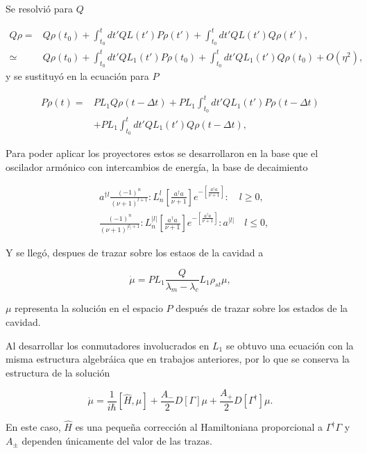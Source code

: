 \documentclass[10pt]{beamer}
\begin{document}
\begin{frame}
Se resolvió para $Q$

\begin{align*}
Q\rho =& Q\rho(t_0) + \int_{t_0}^{t}dt' QL(t')P\rho(t')+\int_{t_0}^{t}dt'QL(t')Q\rho(t'),\\
\simeq & Q\rho(t_0) + \int_{t_0}^{t}dt' QL_1(t')P\rho(t_0)+\int_{t_0}^{t}dt'QL_1(t')Q\rho(t_0)+O(\eta^2),
\end{align*} y se sustituyó en la ecuación para $P$

\begin{align*}
P\dot{\rho}(t) =& PL_1Q\rho(t-\Delta t) + PL_1\int_{t_0}^{t}dt' QL_1(t')P\rho(t-\Delta t)\\
 &+ PL_1\int_{t_0}^{t}dt'QL_1(t')Q\rho(t-\Delta t),
\end{align*} 

\end{frame}

\begin{frame}
Para poder aplicar los proyectores estos se desarrollaron en la base que el oscilador armónico con intercambios de energía, la base de decaimiento

\begin{align*}
&a^{\dagger l}\frac{(-1)^n}{(\nu+1)^{l+1}}:L_n^l[\frac{a^\dagger a}{\nu+1}]e^{-[\frac{a^\dagger a}{\nu+1}]}:\quad l \geq 0, \\
&\frac{(-1)^n}{(\nu+1)^{|l|+1}}:L_n^{|l|}[\frac{a^\dagger a}{\nu+1}]e^{-[\frac{a^\dagger a}{\nu+1}]}:a^{|l|}\quad l \leq 0,
\end{align*}
\end{frame}

\begin{frame}
Y se llegó, despues de trazar sobre los estaos de la cavidad a

\begin{equation*}
\dot{\mu} = PL_1 \frac{Q}{\lambda_m-\lambda_c}L_1\rho_{st}\mu,
\end{equation*}

$\mu$ representa la solución en el espacio $P$ después de trazar sobre los estados de la cavidad. 
\end{frame}

\begin{frame}

Al desarrollar los conmutadores involucrados en $L_1$ se obtuvo una ecuación con la misma estructura algebráica que en trabajos anteriores, por lo que se conserva la estructura de la solución

\begin{equation*}
\dot{\mu} = \frac{1}{i\hbar}[\hat{H},\mu] + \frac{A_-}{2}D[\Gamma]\mu + \frac{A_+}{2}D[\Gamma^\dagger]\mu.
\end{equation*}

En este caso, $\hat{H}$ es una pequeña corrección al Hamiltoniana proporcional a $\Gamma^\dagger \Gamma$ y $A_\pm$ dependen únicamente del valor de las trazas.

\end{frame}
\end{document}
